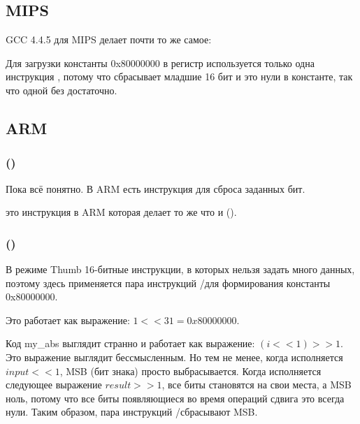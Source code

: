 \subsection{MIPS}

GCC 4.4.5 для MIPS делает почти то же самое:



Для загрузки константы 0x80000000 в регистр используется только одна инструкция \LUI, потому что \LUI сбрасывает
младшие 16 бит и это нули в константе, так что одной \LUI без \ORI достаточно.

\subsection{ARM}

\subsubsection{\OptimizingKeilVI (\ARMMode)}



Пока всё понятно.
В ARM есть инструкция \BIC для сброса заданных бит.

\EOR это инструкция в ARM которая делает то же что и \XOR ().

\subsubsection{\OptimizingKeilVI (\ThumbMode)}



В режиме Thumb 16-битные инструкции, в которых нельзя задать много данных, поэтому здесь
применяется пара инструкций \MOVS/\LSLS для формирования константы 0x80000000.

Это работает как выражение: $1<<31 = 0x80000000$.

Код my\_abs выглядит странно и работает как выражение: $(i<<1)>>1$.
Это выражение выглядит бессмысленным.
Но тем не менее, когда исполняется $input<<1$, \ac{MSB} (бит знака) просто выбрасывается.
Когда исполняется следующее выражение $result>>1$, все биты становятся на свои места,
а \ac{MSB} ноль, потому что все  биты появляющиеся во время операций сдвига это всегда нули.
Таким образом, пара инструкций \LSLS/\LSRS сбрасывают \ac{MSB}.

